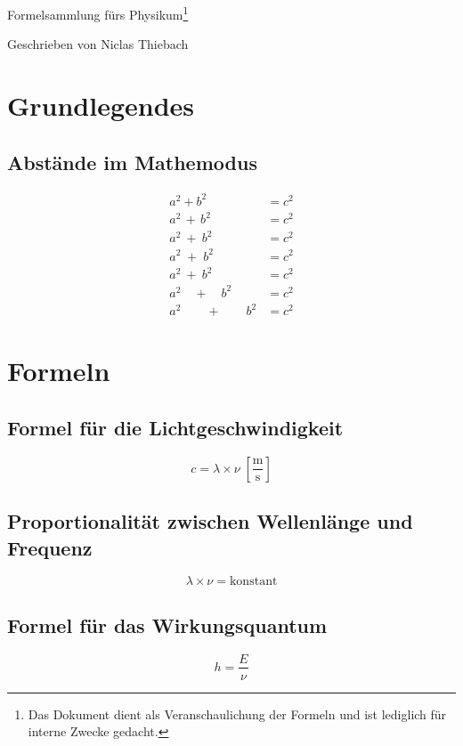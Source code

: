 \documentclass{article}
\begin{document}
\vfill

\begin{center}
    {\Large Formelsammlung fürs Physikum}\footnote{Das Dokument dient als Veranschaulichung der Formeln und ist lediglich für interne Zwecke gedacht.}

    \vspace{1cm}
    
    Geschrieben von Niclas Thiebach
\end{center}

\vfill

\newpage

\section{Grundlegendes}

\subsection{Abstände im Mathemodus}
\begin{align*}
    a^2 \! + \! b^2 &= c^2 \\
    a^2 \, + \, b^2 &= c^2 \\
    a^2 \: + \: b^2 &= c^2 \\
    a^2 \; + \; b^2 &= c^2 \\
    a^2 \ + \ b^2 &= c^2 \\
    a^2 \quad + \quad b^2 &= c^2 \\
    a^2 \qquad + \qquad b^2 &= c^2
\end{align*}


\section{Formeln}

\subsection{Formel für die Lichtgeschwindigkeit}
\begin{equation}
    c = \lambda \times \nu \; \mathrm{\left[\frac{m}{s}\right]}
\end{equation}

\subsection{Proportionalität zwischen Wellenlänge und Frequenz}
\begin{equation}
    \lambda \times \nu = \mathrm{konstant}
\end{equation}

\subsection{Formel für das Wirkungsquantum}
\begin{equation}
    h = \frac{E}{\nu}
\end{equation}
\end{document}
